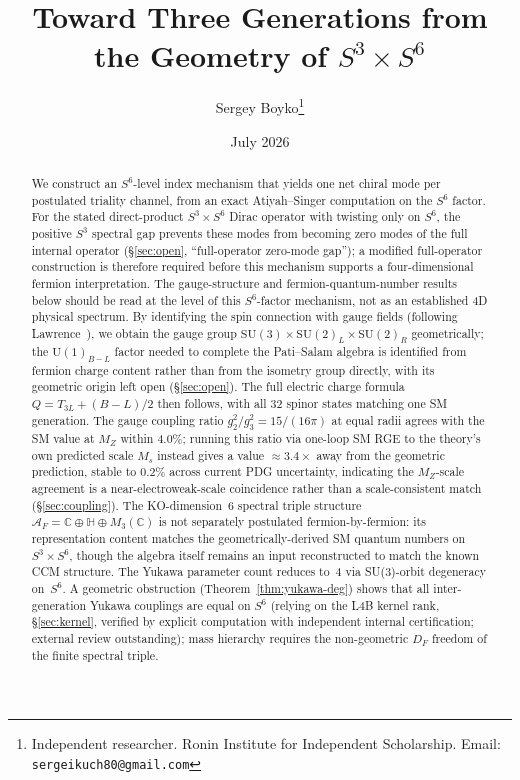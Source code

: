 \documentclass[12pt,a4paper]{article}
\newcommand{\CC}{\mathbb{C}}
\newcommand{\HH}{\mathbb{H}}
\begin{document}
\title{\textbf{Toward Three Generations from the Geometry of $S^3\times S^6$}}

\author{
  Sergey Boyko\thanks{%
    Independent researcher. Ronin Institute for Independent Scholarship.
    Email: \texttt{sergeikuch80@gmail.com}}
}

\date{July 2026}

\maketitle

\begin{abstract}
We construct an $S^6$-level index mechanism that yields one net chiral mode per
postulated triality channel, from an exact Atiyah--Singer computation on the
$S^6$ factor. For the stated direct-product $S^3\times S^6$ Dirac operator with
twisting only on $S^6$, the positive $S^3$ spectral gap prevents these modes
from becoming zero modes of the full internal operator (\S\ref{sec:open},
``full-operator zero-mode gap''); a modified full-operator construction is
therefore required before this mechanism supports a four-dimensional fermion
interpretation. The gauge-structure and fermion-quantum-number results below
should be read at the level of this $S^6$-factor mechanism, not as an
established 4D physical spectrum. By identifying the
spin connection with gauge fields (following Lawrence~\cite{Lawrence2022}), we obtain
the gauge group $\mathrm{SU}(3)\times\mathrm{SU}(2)_L\times\mathrm{SU}(2)_R$ geometrically;
the $\mathrm{U}(1)_{B-L}$ factor needed to complete the Pati--Salam algebra is identified
from fermion charge content rather than from the isometry group directly, with its
geometric origin left open (\S\ref{sec:open}). The full electric charge formula
$Q = T_{3L} + (B{-}L)/2$ then follows, with all 32 spinor states matching one SM
generation. The gauge coupling ratio
$g_2^2/g_3^2 = 15/(16\pi)$ at equal radii agrees with the SM value at $M_Z$
within 4.0\%; running this ratio via one-loop SM RGE to the theory's own predicted
scale $M_s$ instead gives a value $\approx 3.4\times$ away from the geometric
prediction, stable to $0.2\%$ across current PDG uncertainty, indicating the
$M_Z$-scale agreement is a near-electroweak-scale coincidence rather than a
scale-consistent match (\S\ref{sec:coupling}). The KO-dimension~6 spectral triple structure
$\mathcal{A}_F = \CC\oplus\HH\oplus M_3(\CC)$ is not separately postulated
fermion-by-fermion: its representation content matches the geometrically-derived
SM quantum numbers on $S^3\times S^6$, though the algebra itself remains an input
reconstructed to match the known CCM structure. The Yukawa
parameter count reduces to~4 via SU(3)-orbit degeneracy on~$S^6$.
A geometric obstruction (Theorem~\ref{thm:yukawa-deg}) shows that all
inter-generation Yukawa couplings are equal on $S^6$ (relying on the L4B
kernel rank, \S\ref{sec:kernel}, verified by explicit computation with
independent internal certification; external review outstanding); mass
hierarchy requires the non-geometric $D_F$ freedom of the finite spectral triple.


\end{abstract}
\end{document}
